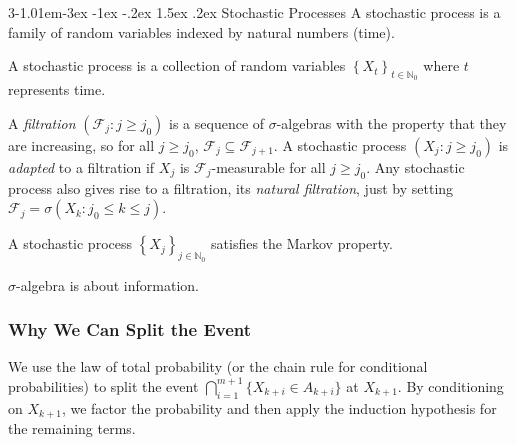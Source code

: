 \documentclass{tufte-handout}
\makeatletter
\renewcommand{\section}{\@startsection{section}%
    {3}{-1.01em}{-3ex \@plus -1ex \@minus -.2ex}%
    {1.5ex \@plus .2ex}
    {\hspace*{-5.5em}\fcolorbox{blue}{blue}{\parbox[c][1.0ex][b]{4em}{\phantom{space}}}
    \normalfont\Large\itshape\color{blue}}}
\makeatother
\begin{document}
\section{Stochastic Processes}
A stochastic process is a family of random variables indexed by natural numbers (time).

\begin{Definition}
    A stochastic process is a collection of random variables
    \(\left\{X_t\right\}_{t\in \mathbb{N}_0}\) where \(t\) represents time.
\end{Definition}


\begin{Definition}[Filtration]
    A \textit{filtration} $(\mathcal{F}_j : j \geq j_0)$ is a sequence of $\sigma$-algebras 
with the property that they are increasing, so for all $j \geq j_0$, 
$\mathcal{F}_j \subseteq \mathcal{F}_{j+1}$. A stochastic process 
$(X_j : j \geq j_0)$ is \textit{adapted} to a filtration if $X_j$ is $\mathcal{F}_j$-measurable for all $j \geq j_0$. 
Any stochastic process also gives rise to a filtration, its \textit{natural filtration}, 
just by setting $\mathcal{F}_j = \sigma(X_k : j_0 \leq k \leq j)$.
\end{Definition}

\begin{Definition}
    A stochastic process \(\left\{X_j\right\}_{j\in \mathbb{N}_0}\)
    satisfies the Markov property.
\end{Definition}

\( \sigma \)-algebra is about information.

\subsubsection*{Why We Can Split the Event}
We use the law of total probability (or the chain rule for conditional probabilities) to split the event
$\bigcap_{i=1}^{m+1} \{X_{k+i} \in A_{k+i}\}$ at $X_{k+1}$. By conditioning on $X_{k+1}$, we factor
the probability and then apply the induction hypothesis for the remaining terms.
\end{document}

